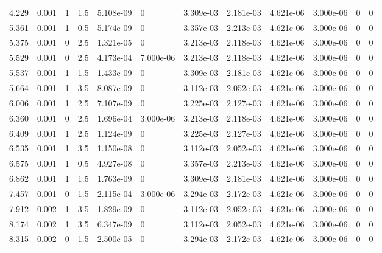 \documentclass[preview]{standalone}
\begin{document}
{{\begin{tabular}{L{1.2cm}C{1.2cm} C{0.3cm}C{0.5cm} C{1.4cm}C{1.4cm} C{1.4cm}C{1.4cm} C{1.6cm}C{1.6cm} C{1.6cm}C{1.6cm}}
  4.229  &  0.001  & 1     & 1.5 &  5.108e-09  & 0  &  3.309e-03&   2.181e-03& 4.621e-06 & 3.000e-06   &  0 & 0  \\ 
  5.361  &  0.001  & 1     & 0.5 &  5.174e-09  & 0  &  3.357e-03&   2.213e-03& 4.621e-06 & 3.000e-06   &  0 & 0  \\ 
  5.375  &  0.001  & 0     & 2.5 &  1.321e-05  & 0  &  3.213e-03&   2.118e-03& 4.621e-06 & 3.000e-06   &  0 & 0  \\ 
  5.529  &  0.001  & 0     & 2.5 &  4.173e-04  & 7.000e-06  &  3.213e-03&   2.118e-03& 4.621e-06 & 3.000e-06   &  0 & 0  \\ 
  5.537  &  0.001  & 1     & 1.5 &  1.433e-09  & 0  &  3.309e-03&   2.181e-03& 4.621e-06 & 3.000e-06   &  0 & 0  \\ 
  5.664  &  0.001  & 1     & 3.5 &  8.087e-09  & 0  &  3.112e-03&   2.052e-03& 4.621e-06 & 3.000e-06   &  0 & 0  \\ 
  6.006  &  0.001  & 1     & 2.5 &  7.107e-09  & 0  &  3.225e-03&   2.127e-03& 4.621e-06 & 3.000e-06   &  0 & 0  \\ 
  6.360  &  0.001  & 0     & 2.5 &  1.696e-04  & 3.000e-06  &  3.213e-03&   2.118e-03& 4.621e-06 & 3.000e-06   &  0 & 0  \\ 
  6.409  &  0.001  & 1     & 2.5 &  1.124e-09  & 0  &  3.225e-03&   2.127e-03& 4.621e-06 & 3.000e-06   &  0 & 0  \\ 
  6.535  &  0.001  & 1     & 3.5 &  1.150e-08  & 0  &  3.112e-03&   2.052e-03& 4.621e-06 & 3.000e-06   &  0 & 0  \\ 
  6.575  &  0.001  & 1     & 0.5 &  4.927e-08  & 0  &  3.357e-03&   2.213e-03& 4.621e-06 & 3.000e-06   &  0 & 0  \\ 
  6.862  &  0.001  & 1     & 1.5 &  1.763e-09  & 0  &  3.309e-03&   2.181e-03& 4.621e-06 & 3.000e-06   &  0 & 0  \\ 
  7.457  &  0.001  & 0     & 1.5 &  2.115e-04  & 3.000e-06  &  3.294e-03&   2.172e-03& 4.621e-06 & 3.000e-06   &  0 & 0  \\ 
  7.912  &  0.002  & 1     & 3.5 &  1.829e-09  & 0  &  3.112e-03&   2.052e-03& 4.621e-06 & 3.000e-06   &  0 & 0  \\ 
  8.174  &  0.002  & 1     & 3.5 &  6.347e-09  & 0  &  3.112e-03&   2.052e-03& 4.621e-06 & 3.000e-06   &  0 & 0  \\ 
  8.315  &  0.002  & 0     & 1.5 &  2.500e-05  & 0  &  3.294e-03&   2.172e-03& 4.621e-06 & 3.000e-06   &  0 & 0  \\ 
\hline 
\end{tabular} 

}}
\end{document}
